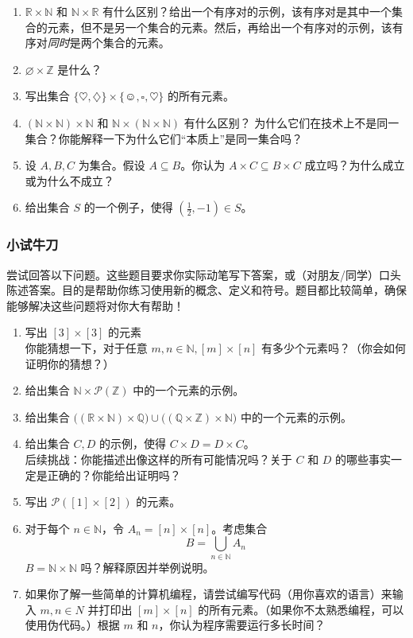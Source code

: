 \begin{enumerate}[label=(\arabic*)]
    \item $\mathbb{R} \times \mathbb{N}$ 和 $\mathbb{N} \times \mathbb{R}$ 有什么区别？给出一个有序对的示例，该有序对是其中一个集合的元素，但不是另一个集合的元素。然后，再给出一个有序对的示例，该有序对\emph{同时}是两个集合的元素。
    \item $\varnothing \times \mathbb{Z}$ 是什么？
    \item 写出集合 $\{\heartsuit, \diamondsuit\} \times \{\smiley{}, \square, \heartsuit\}$ 的所有元素。
    \item $(\mathbb{N} \times \mathbb{N}) \times \mathbb{N}$ 和 $\mathbb{N} \times (\mathbb{N} \times \mathbb{N})$ 有什么区别？ 为什么它们在技术上不是同一集合？你能解释一下为什么它们``本质上''是同一集合吗？
    \item 设 $A,B,C$ 为集合。假设 $A \subseteq B$。你认为 $A \times C \subseteq B \times C$ 成立吗？为什么成立或为什么不成立？
    \item 给出集合 $S$ 的一个例子，使得 $(\frac{1}{2}, -1) \in S$。
\end{enumerate}

\subsubsection*{小试牛刀}

尝试回答以下问题。这些题目要求你实际动笔写下答案，或（对朋友/同学）口头陈述答案。目的是帮助你练习使用新的概念、定义和符号。题目都比较简单，确保能够解决这些问题将对你大有帮助！

\begin{enumerate}[label=(\arabic*)]
    \item 写出 $[3] \times [3]$ 的元素  \\
    你能猜想一下，对于任意 $m, n \in \mathbb{N}, [m] \times [n]$ 有多少个元素吗？（你会如何证明你的猜想？）
    \item 给出集合 $\mathbb{N} \times \mathcal{P}(\mathbb{Z})$ 中的一个元素的示例。
    \item 给出集合 $\big((\mathbb{R} \times \mathbb{N}) \times \mathbb{Q}\big) \cup \big((\mathbb{Q} \times \mathbb{Z}) \times \mathbb{N}\big)$ 中的一个元素的示例。
    \item 给出集合 $C, D$ 的示例，使得 $C \times D = D \times C$。\\
    后续挑战：你能描述出像这样的所有可能情况吗？关于 $C$ 和 $D$ 的哪些事实一定是正确的？你能给出证明吗？
    \item 写出 $\mathcal{P}([1] \times [2])$ 的元素。
    \item 对于每个 $n \in \mathbb{N}$，令 $A_n = [n] \times [n]$。考虑集合
    \[B = \bigcup_{n \in \mathbb{N}} A_n\]
    $B = \mathbb{N} \times \mathbb{N}$ 吗？解释原因并举例说明。
    \item 如果你了解一些简单的计算机编程，请尝试编写代码（用你喜欢的语言）来输入 $m, n \in N$ 并打印出 $[m] \times [n]$ 的所有元素。（如果你不太熟悉编程，可以使用伪代码。）根据 $m$ 和 $n$，你认为程序需要运行多长时间？
\end{enumerate}